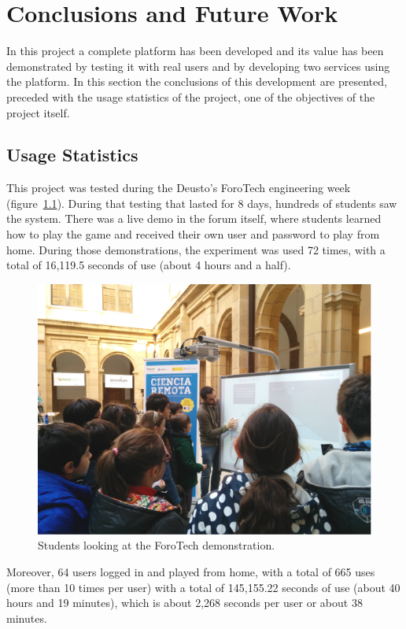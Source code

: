 \chapter{Conclusions and Future Work}

In this project a complete platform has been developed and its value has been demonstrated by
testing it with real users and by developing two services using the platform. In this section the
conclusions of this development are presented, preceded with the usage statistics of the project,
one of the objectives of the project itself.

\section{Usage Statistics}

This project was tested during the Deusto's ForoTech engineering week (figure~\ref{fig:forotech}).
During that testing that lasted for 8 days, hundreds of students saw the system. There was a live
demo in the forum itself, where students learned how to play the game and received their own user
and password to play from home. During those demonstrations, the experiment was used 72 times, with
a total of 16,119.5 seconds of use (about 4 hours and a half).

\begin{figure}[ht]
	\centering
	\includegraphics[height=0.3\textheight]{fig/forotech.jpg}
	\caption{Students looking at the ForoTech demonstration.}
	\label{fig:forotech}
\end{figure}

Moreover, 64 users logged in and played from home, with a total of 665 uses (more than 10 times per
user) with a total of 145,155.22 seconds of use (about 40 hours and 19 minutes), which is about
2,268 seconds per user or about 38 minutes.

